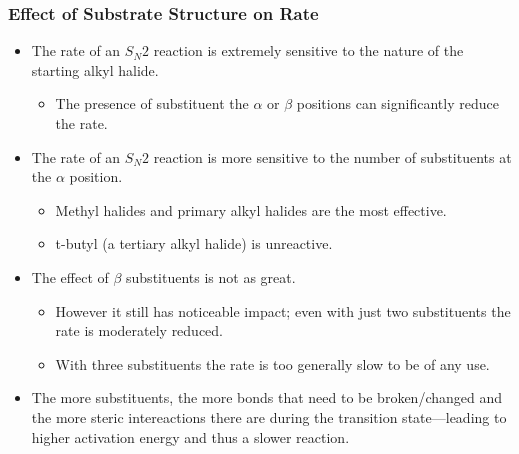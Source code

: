 \documentclass[12pt,a4paper]{article}
\begin{document}
\begin{itemize}
    \subsubsection{Effect of Substrate Structure on Rate}
    \begin{itemize}
        \item The rate of an \(S_N2\) reaction is extremely sensitive to the nature of the starting alkyl halide. 
            \begin{itemize}
                \item The presence of substituent the $\alpha$ or $\beta$ positions can significantly reduce the rate. 
            \end{itemize}
        \item The rate of an \(S_N2\) reaction is more sensitive to the number of substituents at the $\alpha$ position. 
            \begin{itemize}
                \item Methyl halides and primary alkyl halides are the most effective.
                \item t-butyl (a tertiary alkyl halide) is unreactive.
            \end{itemize}
        \item The effect of $\beta$ substituents is not as great.
            \begin{itemize}
                \item However it still has noticeable impact; even with just two substituents the rate is moderately reduced.
                \item With three substituents the rate is too generally slow to be of any use.
            \end{itemize}
        \item The more substituents, the more bonds that need to be broken/changed and the more steric intereactions there are during the transition state---leading to higher activation energy and thus a slower reaction.
        \end{itemize}

\end{itemize}
\end{document}
